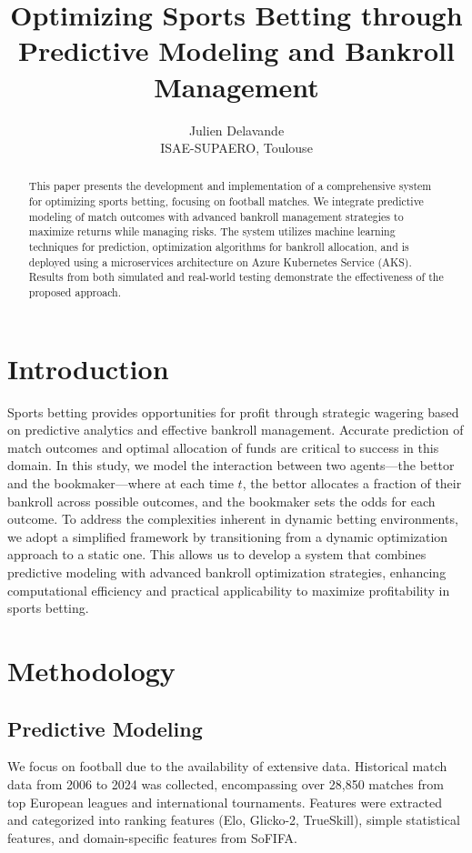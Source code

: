 \documentclass[6pt,twocolumn]{article}
\begin{document}
\title{Optimizing Sports Betting through Predictive Modeling and Bankroll Management}
\author{
    Julien Delavande \\
    ISAE-SUPAERO, Toulouse
}

\date{}
\maketitle

\begin{abstract}
This paper presents the development and implementation of a comprehensive system for optimizing sports betting, focusing on football matches. We integrate predictive modeling of match outcomes with advanced bankroll management strategies to maximize returns while managing risks. The system utilizes machine learning techniques for prediction, optimization algorithms for bankroll allocation, and is deployed using a microservices architecture on Azure Kubernetes Service (AKS). Results from both simulated and real-world testing demonstrate the effectiveness of the proposed approach.
\end{abstract}

\section{Introduction}
Sports betting provides opportunities for profit through strategic wagering based on predictive analytics and effective bankroll management. Accurate prediction of match outcomes and optimal allocation of funds are critical to success in this domain. In this study, we model the interaction between two agents—the bettor and the bookmaker—where at each time \( t \), the bettor allocates a fraction of their bankroll across possible outcomes, and the bookmaker sets the odds for each outcome. To address the complexities inherent in dynamic betting environments, we adopt a simplified framework by transitioning from a dynamic optimization approach to a static one. This allows us to develop a system that combines predictive modeling with advanced bankroll optimization strategies, enhancing computational efficiency and practical applicability to maximize profitability in sports betting.

\section{Methodology}
\subsection{Predictive Modeling}
We focus on football due to the availability of extensive data. Historical match data from 2006 to 2024 was collected, encompassing over 28,850 matches from top European leagues and international tournaments. Features were extracted and categorized into ranking features (Elo, Glicko-2, TrueSkill), simple statistical features, and domain-specific features from SoFIFA.
\end{document}
